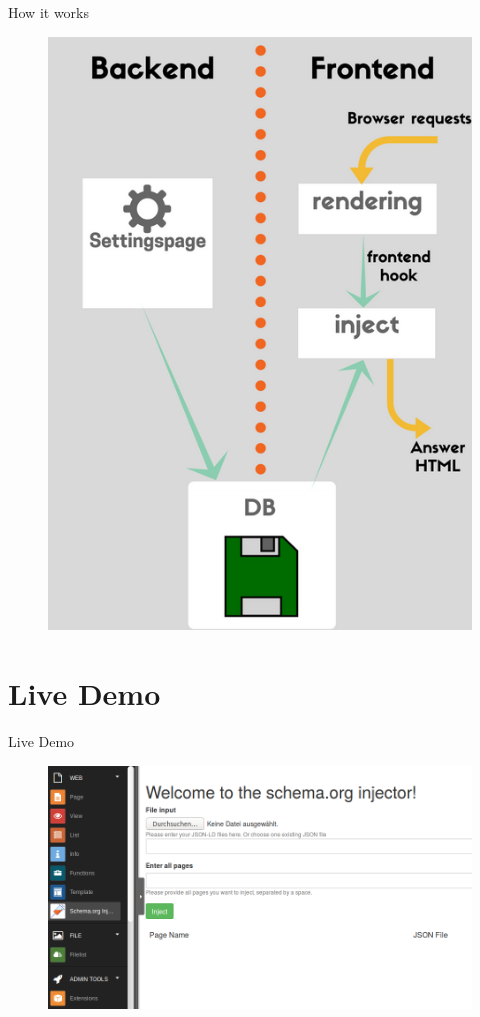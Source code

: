 \documentclass{beamer}
\begin{document}
\begin{frame}{How it works}
	\begin{figure}[ht]
		\centering
		\includegraphics[height=0.75\textwidth]{work_flow.png}
	\end{figure}
\end{frame}

\section{Live Demo}
\begin{frame}{Live Demo}
	\begin{figure}[ht]
		\centering
		\includegraphics[width=1.0\textwidth]{backend_module.png}
	\end{figure}
\end{frame}

\end{document}
